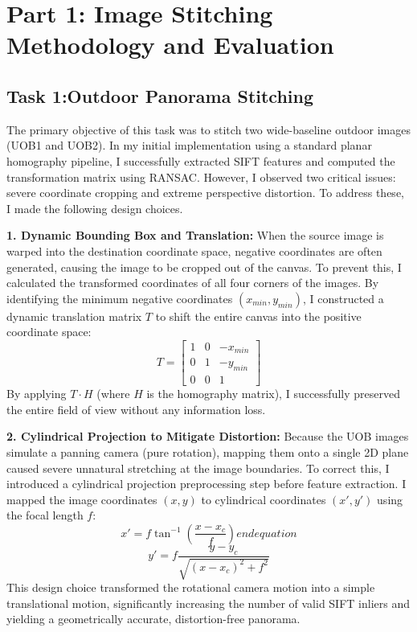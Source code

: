 \documentclass{Resources/UoBLab1}
\begin{document}
    \section{Part 1: Image Stitching Methodology and Evaluation}
    \subsection{Task 1:Outdoor Panorama Stitching}
    The primary objective of this task was to stitch two wide-baseline outdoor
    images (UOB1 and UOB2). In my initial implementation using a standard planar
    homography pipeline, I successfully extracted SIFT features\textbf{\cite{lowe2004}}
    and computed the transformation matrix using RANSAC. However, I observed two
    critical issues: severe coordinate cropping and extreme perspective distortion.
    To address these, I made the following design choices.

    \textbf{1. Dynamic Bounding Box and Translation:} When the source image is
    warped into the destination coordinate space, negative coordinates are often
    generated, causing the image to be cropped out of the canvas. To prevent this,
    I calculated the transformed coordinates of all four corners of the images. By
    identifying the minimum negative coordinates $(x_{min}, y_{min})$, I
    constructed a dynamic translation matrix $T$ to shift the entire canvas into
    the positive coordinate space:
    \begin{equation}
        T =
        \begin{bmatrix}
            1 & 0 & -x_{min} \\
            0 & 1 & -y_{min} \\
            0 & 0 & 1
        \end{bmatrix}
    \end{equation}
    By applying $T \cdot H$ (where $H$ is the homography matrix), I successfully
    preserved the entire field of view without any information loss.

    \textbf{2. Cylindrical Projection to Mitigate Distortion:} Because the UOB images
    simulate a panning camera (pure rotation), mapping them onto a single 2D
    plane caused severe unnatural stretching at the image boundaries. To correct
    this, I introduced a cylindrical projection preprocessing step before
    feature extraction. I mapped the image coordinates $(x, y)$ to cylindrical coordinates
    $(x', y')$ using the focal length $f$:
    \begin{equation}
        x' = f \tan^{-1}\left(\frac{x - x_{c}}{f}\right) end{equation}
    \end{equation}
    \begin{equation}
        y' = f \frac{y - y_{c}}{\sqrt{(x - x_{c})^{2}+ f^{2}}}
    \end{equation}
    This design choice transformed the rotational camera motion into a simple
    translational motion, significantly increasing the number of valid SIFT inliers
    and yielding a geometrically accurate, distortion-free panorama.
\end{document}
